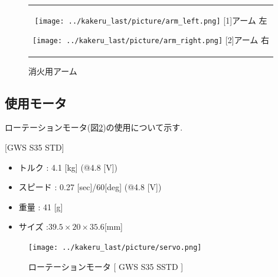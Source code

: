 \begin{figure}[h]
 \centering
 \begin{tabular}{c}

  \begin{minipage}{0.3\hsize}
   \centering
   \texttt{[image: ../kakeru\_last/picture/arm\_left.png]}
   \hspace{1.6cm} [1]アーム 左
  \end{minipage}
  
  \begin{minipage}{0.45\hsize}
   \centering
   \texttt{[image: ../kakeru\_last/picture/arm\_right.png]}
   \hspace{1.6cm} [2]アーム 右
  \end{minipage}
 \end{tabular}
 \caption{消火用アーム}
 \label{arm_real}
\end{figure}

\newpage
\subsection{使用モータ}
ローテーションモータ(図\ref{servo})の使用について示す.

[GWS S35 STD]
\begin{itemize}
 \item トルク        : 4.1 [kg] (@4.8 [V])
 \item スピード      : 0.27 [sec]/60[deg] (@4.8 [V])
 \item 重量          : 41 [g]
 \item サイズ        :$39.5 \times 20 \times 35.6$[mm]
\end{itemize}

\begin{figure}[h]
  \centering
    \texttt{[image: ../kakeru\_last/picture/servo.png]}
    \caption{ローテーションモータ [ GWS S35 SSTD ]}
  \label{servo}
\end{figure}

